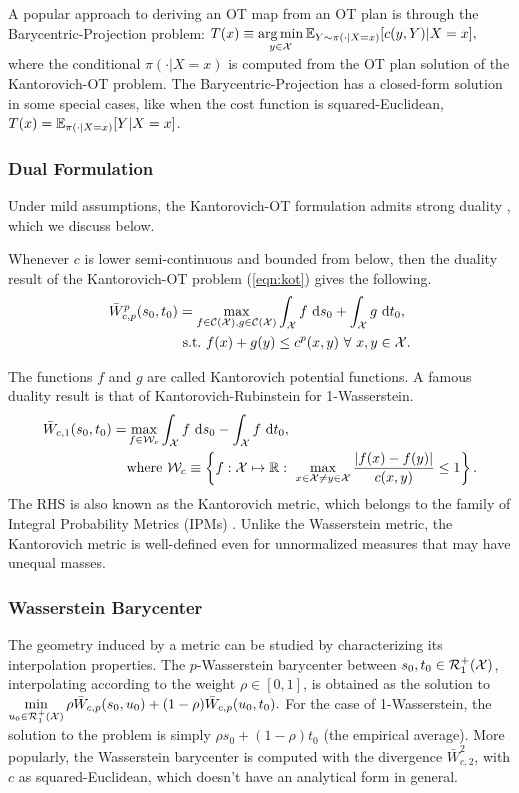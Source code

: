 A popular approach to deriving an OT map from an OT plan is through the Barycentric-Projection problem: $T(x)\equiv \mathop{\rm arg\,min}\limits_{y\in \mathcal{X}} \mathbb{E}_{Y\sim \pi(\cdot|X=x)}[c(y, Y)|X=x],$
where the conditional $\pi(\cdot|X=x)
$ is computed from the OT plan solution of the Kantorovich-OT problem. The Barycentric-Projection has a closed-form solution in some special cases, like when the cost function is squared-Euclidean, $T(x)=\mathbb{E}_{\pi(\cdot|X=x)}[Y|X=x]$.
\stoptoc
\subsubsection{Dual Formulation}
Under mild assumptions, the Kantorovich-OT formulation admits strong duality \citep[Theorem (1.42)]{santab}, which we discuss below.
\begin{definition}
Whenever $c$ is lower semi-continuous and bounded from below, then the duality result of the Kantorovich-OT problem (\ref{eqn:kot}) gives the following.
\begin{align}
    \bar{W}_{c, p}^p(s_0, t_0) &= \max\limits_{f\in\calC(\calX),g\in\calC(\calX)}\int_\calX f\ \textup{d}s_0+\int_\calX g\ \textup{d}t_0, \nonumber\\
    &\ \textup{s.t.}\ f(x)+g(y)\le c^p(x,y)\ \forall\ x,y\in\calX.
\end{align}
\end{definition}
The functions $f$ and $g$ are called Kantorovich potential functions.
\noindent
A famous duality result is that of Kantorovich-Rubinstein for 1-Wasserstein.
\begin{align*}
    \bar{W}_{c, 1}(s_0, t_0) = &\max\limits_{f\in \mathcal{W}_c} \int_{\mathcal{X}} f\ \textup{d}s_0-\int_{\mathcal{X}} f\ \textup{d}t_0,\nonumber\\
    &\textup{where }\mathcal{W}_c\equiv \left\{ f:\mathcal{X}\mapsto \mathbb{R} :~ \max\limits_{x\in\mathcal{X}\neq y\in\mathcal{X}} \frac{|f(x)-f(y)|}{c(x, y)} \leq 1 \right\}.
\end{align*}
The RHS is also known as the Kantorovich metric, which belongs to the family of Integral Probability Metrics (IPMs) \citep{Sriperumbudur09onintegral}. Unlike the Wasserstein metric, the Kantorovich metric is well-defined even for unnormalized measures that may have unequal masses.

\subsubsection{Wasserstein Barycenter}
The geometry induced by a metric can be studied by characterizing its interpolation properties. The $p$-Wasserstein barycenter between $s_0, t_0\in \mathcal{R}^+_1(\mathcal{X})$, interpolating according to the weight $\rho\in [0, 1]$, is obtained as the solution to $
    \min\limits_{u_0\in \mathcal{R}^+_1(\mathcal{X})} \rho\bar{W}_{c, p}(s_0, u_0)  + (1-\rho)\bar{W}_{c, p}(u_0, t_0).$
For the case of 1-Wasserstein, the solution to the problem is simply $\rho s_0 + (1-\rho)t_0$ (the empirical average). More popularly, the Wasserstein barycenter is computed with the divergence $\bar{W}_{c, 2}^2 $, with $c$ as squared-Euclidean, which doesn't have an analytical form in general.

